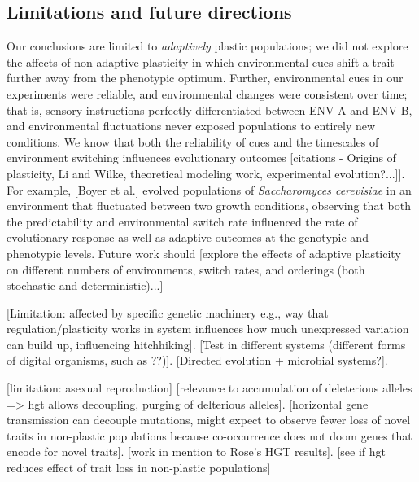 \vspace{0.25cm}
\subsection{Limitations and future directions}

Our conclusions are limited to \textit{adaptively} plastic populations; we did not explore the affects of non-adaptive plasticity in which environmental cues shift a trait further away from the phenotypic optimum.
Further, environmental cues in our experiments were reliable, and environmental changes were consistent over time; that is, sensory instructions perfectly differentiated between ENV-A and ENV-B, and environmental fluctuations never exposed populations to entirely new conditions.
We know that both the reliability of cues and the timescales of environment switching influences evolutionary outcomes [citations - Origins of plasticity, Li and Wilke, theoretical modeling work, experimental evolution?...]].
For example, [Boyer et al.] evolved populations of \textit{Saccharomyces cerevisiae} in an environment that fluctuated between two growth conditions, observing that both the predictability and environmental switch rate influenced the rate of evolutionary response as well as adaptive outcomes at the genotypic and phenotypic levels. %
Future work should [explore the effects of adaptive plasticity on different numbers of environments, switch rates, and orderings (both stochastic and deterministic)...]

[Limitation: affected by specific genetic machinery e.g., way that regulation/plasticity works in system influences how much unexpressed variation can build up, influencing hitchhiking].
[Test in different systems (different forms of digital organisms, such as ??)].
[Directed evolution + microbial systems?].

[limitation: asexual reproduction]
[relevance to accumulation of deleterious alleles => hgt allows decoupling, purging of delterious alleles].
[horizontal gene transmission can decouple mutations, might expect to observe fewer loss of novel traits in non-plastic populations because co-occurrence does not doom genes that encode for novel traits].
[work in mention to Rose's HGT results].
[see if hgt reduces effect of trait loss in non-plastic populations]

